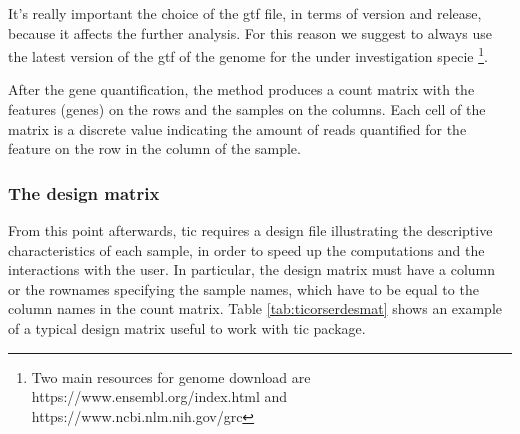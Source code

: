 It's really important the choice of the \gls{gtf} file, in terms of version and release, because it affects the further analysis. For this reason we suggest to always use the latest version of the \gls{gtf} of the genome for the under investigation specie \footnote{Two main resources for genome download are https://www.ensembl.org/index.html and https://www.ncbi.nlm.nih.gov/grc}. 

After the gene quantification, the method produces a count matrix with the features (genes) on the rows and the samples on the columns. 
Each cell of the matrix is a discrete value indicating the amount of reads quantified for the feature on the row in the column of the sample. 

\subsubsection{The design matrix}
From this point afterwards, \gls{tic} requires a design file illustrating the descriptive characteristics of each sample, in order to speed up the computations and the interactions with the user.
In particular, the design matrix must have a column or the rownames specifying the sample names, which have to be equal to the column names in the count matrix.
Table \ref{tab:ticorserdesmat} shows an example of a typical design matrix useful to work with \gls{tic} package.


